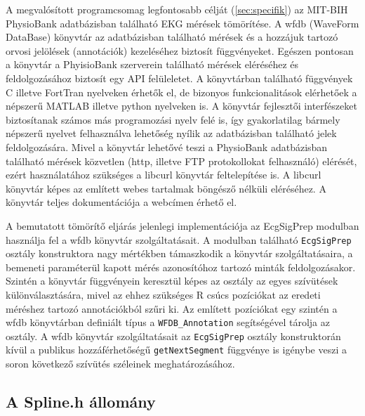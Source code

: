 \documentclass[oneside,titlepage,12pt,a4paper]{report}
\begin{document}
A megvalósított programcsomag legfontosabb célját (\ref{sec:specifik}) az MIT-BIH PhysioBank adatbázisban található EKG mérések tömörítése. A wfdb (WaveForm DataBase) könyvtár az adatbázisban található mérések és a hozzájuk tartozó orvosi jelölések (annotációk) kezeléséhez biztosít függvényeket. Egészen pontosan a könyvtár a PhyisioBank szerverein található mérések eléréséhez és feldolgozásához biztosít egy API felüleletet. A könyvtárban található függvények C illetve FortTran nyelveken érhetők el, de bizonyos funkcionalitások elérhetőek a népszerű MATLAB illetve python nyelveken is. A könyvtár fejlesztői interfészeket biztosítanak számos más programozási nyelv felé is, így gyakorlatilag bármely népszerű nyelvet felhasználva lehetőség nyílik az adatbázisban található jelek feldolgozására. Mivel a könyvtár lehetővé teszi a PhysioBank adatbázisban található mérések közvetlen (http, illetve FTP protokollokat felhasználó) elérését, ezért használatához szükséges a libcurl könyvtár feltelepítése is. A libcurl könyvtár képes az említett webes tartalmak böngésző nélküli eléréséhez. A könyvtár teljes dokumentációja a \cite{wfdbEler} webcímen érhető el. 
\par A bemutatott tömörítő eljárás jelenlegi implementációja az EcgSigPrep modulban használja fel a wfdb könyvtár szolgáltatásait. A modulban található \texttt{EcgSigPrep} osztály konstruktora nagy mértékben támaszkodik a könyvtár szolgáltatásaira, a bemeneti paraméterül kapott mérés azonosítóhoz tartozó minták feldolgozásakor. Szintén a könyvtár függvényein keresztül képes az osztály az egyes szívütések különválasztására, mivel az ehhez szükséges R csúcs pozíciókat az eredeti méréshez tartozó annotációkból szűri ki. Az említett pozíciókat egy szintén a wfdb könyvtárban definiált típus a \texttt{WFDB\_Annotation} segítségével tárolja az osztály. A wfdb könyvtár szolgáltatásait az \texttt{EcgSigPrep} osztály konstruktorán kívül a publikus hozzáférhetőségű \texttt{getNextSegment} függvénye is igénybe veszi a soron következő szívütés széleinek meghatározásához. 

\subsection*{A Spline.h állomány}
\end{document}
